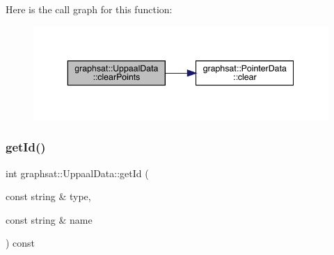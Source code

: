 Here is the call graph for this function\+:\nopagebreak
\begin{figure}[H]
\begin{center}
\leavevmode
\includegraphics[width=343pt]{classgraphsat_1_1_uppaal_data_a6f8e7702012896ac9757a11b7576546a_cgraph}
\end{center}
\end{figure}
\mbox{\label{classgraphsat_1_1_uppaal_data_a39f89632de7e1d1a1f2b1fb1fbd05bd1}} 
\subsubsection{\texorpdfstring{getId()}{getId()}}
{\footnotesize\ttfamily int graphsat\+::\+Uppaal\+Data\+::get\+Id (\begin{DoxyParamCaption}\item[{const string \&}]{type,  }\item[{const string \&}]{name }\end{DoxyParamCaption}) const\hspace{0.3cm}{\ttfamily [inline]}}


